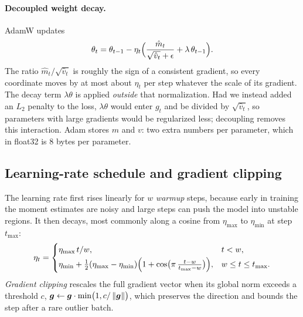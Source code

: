 \paragraph{Decoupled weight decay.} AdamW \citep{c01-loshchilov2019adamw} updates
\begin{equation}\label{eq:c01-adamw}
  \theta_t = \theta_{t-1} - \eta_t\Bigl(\frac{\hat{m}_t}{\sqrt{\hat{v}_t} + \epsilon} + \lambda\,\theta_{t-1}\Bigr).
\end{equation}
The ratio $\hat{m}_t/\sqrt{\hat{v}_t}$ is roughly the sign of a consistent gradient, so every
coordinate moves by at most about $\eta_t$ per step whatever the scale of its gradient.
The decay term $\lambda\theta$ is applied \emph{outside} that normalization. Had we instead
added an $L_2$ penalty to the loss, $\lambda\theta$ would enter $g_t$ and be divided by
$\sqrt{\hat{v}_t}$, so parameters with large gradients would be regularized less; decoupling
removes this interaction. Adam stores $m$ and $v$: two extra numbers per parameter, which in
float32 is $8$ bytes per parameter.

\subsection{Learning-rate schedule and gradient clipping}\label{sec:c01-schedule}

The learning rate first rises linearly for $w$ \emph{warmup} steps, because early in
training the moment estimates are noisy and large steps can push the model into unstable
regions. It then decays, most commonly along a cosine \citep{c01-loshchilov2017sgdr}
from $\eta_{\max}$ to $\eta_{\min}$ at step $t_{\max}$:
\begin{equation}\label{eq:c01-cosine}
  \eta_t =
  \begin{cases}
    \eta_{\max}\, t/w, & t < w,\\[2pt]
    \eta_{\min} + \tfrac{1}{2}(\eta_{\max} - \eta_{\min})
      \Bigl(1 + \cos\bigl(\pi\,\tfrac{t - w}{t_{\max} - w}\bigr)\Bigr), & w \le t \le t_{\max}.
  \end{cases}
\end{equation}
\emph{Gradient clipping} \citep{c01-pascanu2013difficulty} rescales the full gradient vector
when its global norm exceeds a threshold $c$,
$\bm{g} \gets \bm{g}\cdot\min\bigl(1, c/\left\lVert \bm{g}\right\rVert\bigr)$, which preserves the
direction and bounds the step after a rare outlier batch.

